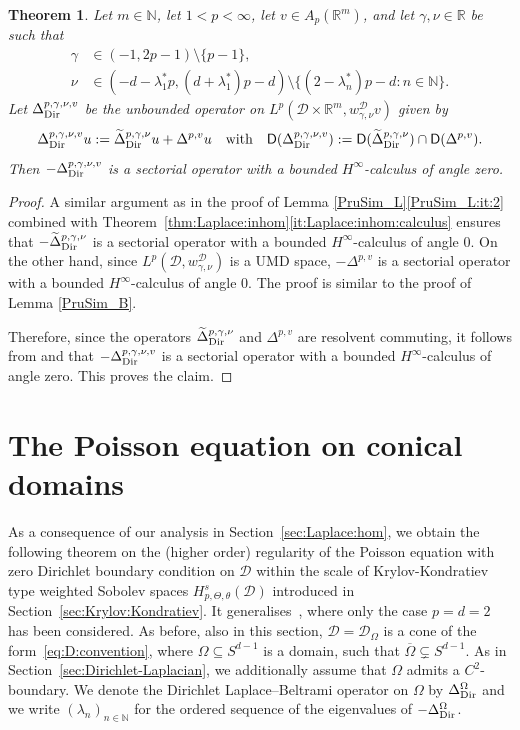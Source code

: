 \documentclass[12pt,a4paper, reqno]{amsart}
\theoremstyle{plain}
\newtheorem{theorem}{Theorem}[section]
\theoremstyle{definition}
\theoremstyle{remark}
\numberwithin{equation}{section}
\newcommand{\1}{\mathbbm{1}}
\newcommand{\R}{\ensuremath{\mathbb{R}}}
\newcommand{\N}{\ensuremath{\mathbb{N}}}
\newcommand{\calD}{\ensuremath{\mathcal{D}}}
\newcommand{\sfD}{\ensuremath{\mathsf{D}}}
\newcommand{\Dir}{\textup{Dir}}
\begin{document}
\begin{theorem}\label{thm:Laplace:inhom:wedge}
    Let $m \in \N$, 
    let  $1<p<\infty$, let $v\in A_p(\R^m)$, and let $\gamma,\nu\in\R$ be such that
    \[\begin{aligned}
        \gamma&\in (-1,2p-1)\setminus\{p-1\},\\
        \nu&\in (-d-\lambda_1^*p,(d+\lambda_1^*)p-d)\setminus \{ (2-\lambda_n^*)p-d\colon n\in \N\}.
    \end{aligned}\]
Let $\Delta_\Dir^{p,\gamma,\nu,v}$ be the unbounded operator on $L^p(\calD \times \R^{m},w_{\gamma,\nu}^\calD v)$ given by 
\[  \Delta_\Dir^{p,\gamma,\nu,v}u:= \widetilde\Delta^{p,\gamma,\nu}_\Dir u+\Delta^{p,v}u\quad \text{with}\quad \sfD(\Delta_\Dir^{p,\gamma,\nu,v}):= \sfD(\widetilde\Delta_\Dir^{p,\gamma,\nu})\cap\sfD(\Delta^{p,v}).\]
Then $-\Delta_\Dir^{p,\gamma,\nu, v}$ is a sectorial operator with a bounded $H^\infty$-calculus of angle zero. 
\end{theorem}
\begin{proof}
    A similar argument as in the proof of Lemma \ref{PruSim_L}\ref{PruSim_L:it:2} combined with Theorem~\ref{thm:Laplace:inhom}\ref{it:Laplace:inhom:calculus} ensures that  $-\widetilde \Delta_{\Dir}^{p,\gamma,\nu}$ is  a sectorial operator with a bounded $H^\infty$-calculus of angle $0$. 
    On the other hand, since $L^p(\calD,w_{\gamma,\nu}^\calD)$ is a UMD space,  $-\Delta^{p,v}$ is a sectorial operator with a bounded $H^\infty$-calculus of angle $0$. The proof is similar to the proof of Lemma \ref{PruSim_B}.

    
    Therefore, since the operators $\widetilde\Delta_\Dir^{p,\gamma,\nu}$ and $\Delta^{p,v}$ are resolvent commuting,  it follows from 
    \cite[Theorem 16.3.10]{aibs3} and \cite[Proposition 7.5.4]{aibs2}
    that $-\Delta_\Dir^{p,\gamma,\nu,v}$  
    is a sectorial operator with a bounded $H^\infty$-calculus of angle zero. This proves the claim. 
\end{proof}


\section{The Poisson equation on conical domains}\label{sec:Poisson}
As a consequence of our analysis in Section~\ref{sec:Laplace:hom}, we obtain the following theorem on the (higher order) regularity of the Poisson equation with zero Dirichlet boundary condition on $\calD$ within the scale of Krylov-Kondratiev type weighted Sobolev spaces $H^s_{p,\Theta,\theta}(\calD)$ introduced in Section~\ref{sec:Krylov:Kondratiev}.
It generalises~\cite[Theorem~4.1(ii)]{cioicalicht2024sobolevspacesmixedweights}, where only the case $p=d=2$ has been considered.
%
As before, also in this section, $\calD=\calD_\Omega$ is a cone of the form~\eqref{eq:D:convention}, where $\Omega\subseteq S^{d-1}$ is a domain, such that $\overline{\Omega}\subsetneq S^{d-1}$. As in Section~\ref{sec:Dirichlet-Laplacian}, we additionally assume that $\Omega$ admits a $C^2$-boundary. We denote the  Dirichlet Laplace--Beltrami operator on $\Omega$ by $\Delta_\Dir^\Omega$ and we write $(\lambda_n)_{n\in\N}$ for the ordered sequence of the eigenvalues of $-\Delta_\Dir^{\Omega}$.
\end{document}
